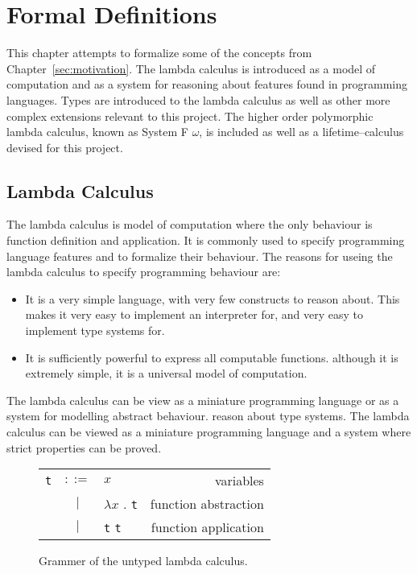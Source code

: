 \chapter{Formal Definitions}\label{sec:formal}
This chapter attempts to formalize some of the concepts from Chapter~\ref{sec:motivation}.
The lambda calculus is introduced as a model of computation and as a system for
reasoning about features found in programming languages. Types are introduced
to the lambda calculus as well as other more complex extensions relevant to
this project. The higher order polymorphic lambda calculus, known as
System F $\omega$, is included as well as a lifetime--calculus devised for this
project.

\section{Lambda Calculus}\label{sec:lambdacalc}
The lambda calculus is model of computation where the only behaviour is
function definition and application. It is commonly used to specify programming
language features and to formalize their behaviour.
The reasons for useing the lambda calculus to specify programming behaviour are:
\begin{itemize}
    \item It is a very simple language, with very few constructs to reason about.
        This makes it very easy to implement an interpreter for, and very easy
        to implement type systems for.
    \item It is sufficiently powerful to express all computable functions.
        although it is extremely simple, it is a universal model of computation.
\end{itemize}
The lambda calculus can be view as a  miniature programming language or as a
system for modelling abstract behaviour. 
reason about type systems. The lambda calculus can be viewed as a miniature
programming language and a system where strict properties can be proved.

\begin{figure}[H]\label{fig:lambdaCalc}
    \begin{tabular}{l c p{3cm} r}
        \texttt{t} & $ ::= $ & $ x $ &                   variables \\
      & $ | $ & $ \lambda x $ . \texttt{t} &          function abstraction \\
      & $ | $ & \texttt{t} \texttt{t} &          function application \\
    \end{tabular}
    \caption{Grammer of the untyped lambda calculus.}
\end{figure}

